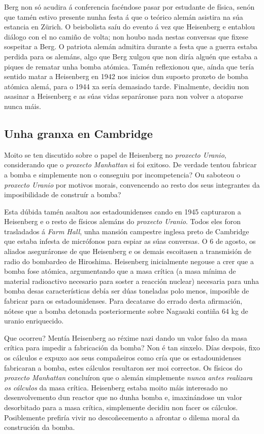 \begin{refsection}
\begin{multicols}{2}
Berg non só acudira á conferencia facéndose pasar por estudante de física,
senón que tamén estivo presente nunha festa á que o teórico alemán asistira na
súa estancia en Zürich. O beisbolista saíu do evento á vez que Heisenberg e
entablou diálogo con el no camiño de volta; non houbo nada nestas conversas que
fixese sospeitar a Berg. O patriota alemán admitira durante a festa que a
guerra estaba perdida para os alemáns, algo que Berg xulgou que non diría
alguén que estaba a piques de rematar unha bomba atómica. Tamén reflexionou
que, aínda que tería sentido matar a Heisenberg en 1942 nos inicios dun suposto
proxeto de bomba atómica alemá, para o 1944 xa sería demasiado tarde.
Finalmente, decidiu non asasinar a Heisenberg e as súas vidas separáronse para
non volver a atoparse nunca máis.

\subsection*{Unha granxa en Cambridge}

Moito se ten discutido sobre o papel de Heisenberg no \textit{proxecto Uranio},
considerando que o \textit{proxecto Manhattan} si foi exitoso. De verdade
tentou fabricar a bomba e simplemente non o conseguiu por incompetencia? Ou
saboteou o \textit{proxecto Uranio} por motivos morais, convencendo ao resto
dos seus integrantes da imposibilidade de construír a bomba?

Esta dúbida tamén asaltou aos estadounidenses cando en 1945 capturaron a
Heisenberg e o resto de físicos alemáns do \textit{proxecto Uranio}. Todos eles
foron trasladados á \textit{Farm Hall}, unha mansión campestre inglesa preto de
Cambridge que estaba infesta de micrófonos para espiar as súas conversas. O 6
de agosto, os aliados aseguráronse de que Heisenberg e os demais escoitasen a
transmisión de radio do bombardeo de Hiroshima. Heisenberg inicialmente negouse
a crer que a bomba fose atómica, argumentando que a masa crítica (a masa mínima
de material radioactivo necesario para soster a reacción nuclear) necesaria
para unha bomba desas características debía ser dúas toneladas polo menos,
imposible de fabricar para os estadounidenses. Para decatarse do errado desta
afirmación, nótese que a bomba detonada posteriormente sobre Nagasaki contiña
64 kg de uranio enriquecido.

Que ocorreu? Mentía Heisenberg ao réxime nazi dando un valor falso da masa
crítica para impedir a fabricación da bomba? Non é tan sinxelo. Días despois,
fixo os cálculos e expuxo aos seus compañeiros como cría que os estadounidenses
fabricaran a bomba, estes cálculos resultaron ser moi correctos. Os físicos do
\textit{proxecto Manhattan} concluíron que o alemán simplemente \textit{nunca
antes realizara os cálculos} da masa crítica. Heisenberg estaba moito máis
interesado no desenvolvemento dun reactor que no dunha bomba e, imaxinándose un
valor desorbitado para a masa crítica, simplemente decidiu non facer os
cálculos. Posiblemente prefiría vivir no descoñecemento a afrontar o dilema
moral da construción da bomba.


\end{multicols}
\end{refsection}
